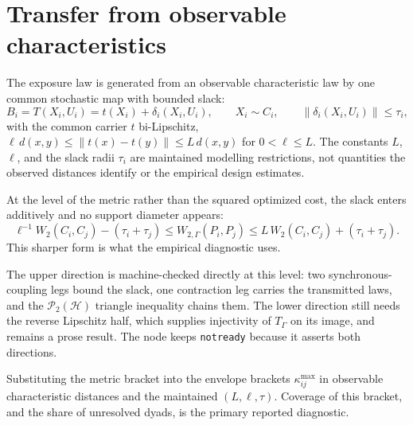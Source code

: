 \section{Transfer from observable characteristics}

\begin{definition}
  \label{ass:random-common-map}
  The exposure law is generated from an observable characteristic law by one
  common stochastic map with bounded slack:
  \[
    B_i=T(X_i,U_i)=t(X_i)+\delta_i(X_i,U_i),\qquad X_i\sim C_i,\qquad
    \lVert\delta_i(X_i,U_i)\rVert\le\tau_i,
  \]
  with the common carrier \(t\) bi-Lipschitz,
  \(\ell\,d(x,y)\le\lVert t(x)-t(y)\rVert\le L\,d(x,y)\) for
  \(0<\ell\le L\).
  The constants \(L\), \(\ell\), and the slack radii \(\tau_i\) are maintained
  modelling restrictions, not quantities the observed distances identify or the
  empirical design estimates.
\end{definition}



\begin{corollary}
  \label{cor:random-w2-metric}
  \notready
  At the level of the metric rather than the squared optimized cost, the slack
  enters additively and no support diameter appears:
  \[
    \ell^{-1}W_2(C_i,C_j)-(\tau_i+\tau_j)
    \le W_{2,\Gamma}(P_i,P_j)
    \le L\,W_2(C_i,C_j)+(\tau_i+\tau_j).
  \]
  This sharper form is what the empirical diagnostic uses.

  The upper direction is machine-checked directly at this level: two
  synchronous-coupling legs bound the slack, one contraction leg carries the
  transmitted laws, and the \(\mathcal P_2(\mathcal H)\) triangle inequality
  chains them.
  The lower direction still needs the reverse Lipschitz half, which supplies
  injectivity of \(T_\Gamma\) on its image, and remains a prose result.
  The node keeps \texttt{notready} because it asserts both directions.
\end{corollary}

\begin{corollary}
  \label{eq:random-kappa-bracket}
  \notready
  Substituting the metric bracket into the envelope brackets
  \(\kappa^{\max}_{ij}\) in observable characteristic distances and the
  maintained \((L,\ell,\tau)\).
  Coverage of this bracket, and the share of unresolved dyads, is the primary
  reported diagnostic.
\end{corollary}

